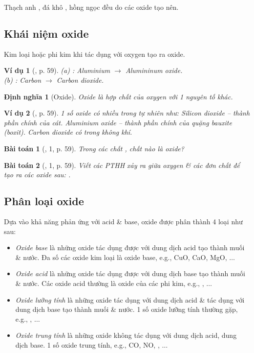\documentclass{article}
\newtheorem{baitoan}{Bài toán}
\newtheorem{dinhnghia}{Định nghĩa}
\newtheorem{vidu}{Ví dụ}
\begin{document}
Thạch anh , đá khô , hồng ngọc  đều do các oxide tạo nên.

\subsection{Khái niệm oxide}
Kim loại hoặc phi kim khi tác dụng với oxygen tạo ra oxide.

\begin{vidu}[\cite{SGK_KHTN_8_Canh_Dieu}, p. 59]
	(a) \emph{}: Aluminium $\to$ Alumininum oxide.\\(b) \emph{}: Carbon $\to$ Carbon dioxide.
\end{vidu}

\begin{dinhnghia}[Oxide]
	\emph{Oxide} là hợp chất của oxygen với 1 nguyên tố khác.
\end{dinhnghia}

\begin{vidu}[\cite{SGK_KHTN_8_Canh_Dieu}, p. 59]
	1 số oxide có nhiều trong tự nhiên như: Silicon dioxide \emph{} -- thành phần chính của cát. Aluminium oxide \emph{} -- thành phần chính của quặng bauxite (boxit). Carbon dioxide \emph{} có trong không khí.
\end{vidu}

\begin{baitoan}[\cite{SGK_KHTN_8_Canh_Dieu}, 1, p. 59]
	Trong các chất \emph{}, chất nào là oxide?
\end{baitoan}

\begin{baitoan}[\cite{SGK_KHTN_8_Canh_Dieu}, 1, p. 59]
	Viết các PTHH xảy ra giữa oxygen \& các đơn chất để tạo ra các oxide sau: \emph{}.
\end{baitoan}

\subsection{Phân loại oxide}
Dựa vào khả năng phản ứng với acid \& base, oxide được phân thành 4 loại như sau:
\begin{itemize}
	\item \textit{Oxide base} là những oxide tác dụng được với dung dịch acid tạo thành muối \& nước. Đa số các oxide kim loại là oxide base, e.g., CuO, CaO, MgO, $\ldots$
	\item \textit{Oxide acid} là những oxide tác dụng được với dung dịch base tạo thành muối \& nước. Các oxide acid thường là oxide của các phi kim, e.g., , $\ldots$
	\item \textit{Oxide lưỡng tính} là những oxide tác dụng với dung dịch acid \& tác dụng với dung dịch base tạo thành muối \& nước. 1 số oxide lưỡng tính thường gặp, e.g., , $\ldots$
	\item \textit{Oxide trung tính} là những oxide không tác dụng với dung dịch acid, dung dịch base. 1 số oxide trung tính, e.g., CO, NO, , $\ldots$
\end{itemize}
\end{document}

